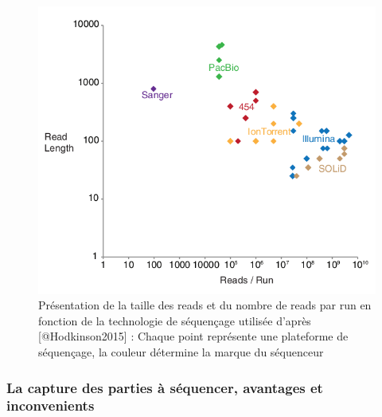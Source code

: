 \documentclass[12pt,twoside]{reedthesis}
\theoremstyle{definition}
\theoremstyle{definition}
\theoremstyle{remark}
\begin{document}
  \begin{figure}
  
  {\centering \includegraphics[scale=.55]{figure/read_per_run} 
  
  }
  
  \caption[Présentation de la taille des reads et du nombre de reads par run en fonction de la technologie de séquençage utilisée]{Présentation de la taille des reads et du nombre de reads par run en fonction de la technologie de séquençage utilisée d'après [@Hodkinson2015] : Chaque point représente une plateforme de séquençage, la couleur détermine la marque du séquenceur}\label{fig:readPerRun}
  \end{figure}
  
  \subsubsection{La capture des parties à séquencer, avantages et
  inconvenients}\label{la-capture-des-parties-a-sequencer-avantages-et-inconvenients}
  
\end{document}
